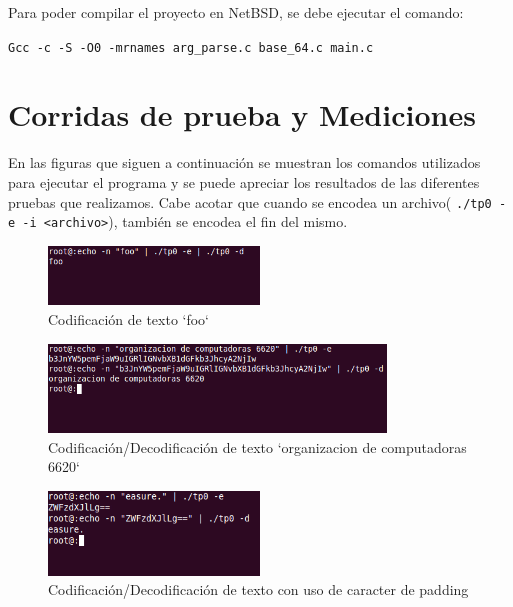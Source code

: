 \documentclass[a4paper,10pt,oneside]{article}
\begin{document}
	Para poder compilar el proyecto en NetBSD, se debe ejecutar el comando:
	
	\begin{center}
	\texttt{Gcc -c -S -O0 -mrnames arg_parse.c base_64.c main.c} 
	\end{center}
	
	
\section{Corridas de prueba y Mediciones}

	En las figuras que siguen a continuación se muestran los comandos utilizados para ejecutar el programa y se puede apreciar los resultados de las diferentes pruebas que realizamos. Cabe acotar que cuando se encodea un archivo( \texttt{./tp0 -e -i <archivo>}), también se encodea el fin del mismo. \newpage
	
	\begin{figure}[H]
		\begin{center}
			\includegraphics[width=0.50\textwidth]{test1.png}
		\end{center}
		\caption{Codificación de texto `foo`} \label{Figura 1}
	\end{figure}

	\begin{figure}[H]
		\begin{center}
			\includegraphics[width=0.80\textwidth]{test2.png}
		\end{center}
		\caption{Codificación/Decodificación de texto `organizacion de computadoras 6620`} \label{Figura 2}
	\end{figure}

	\begin{figure}[H]
		\begin{center}
			\includegraphics[width=0.50\textwidth]{test3.png}
		\end{center}
		\caption{Codificación/Decodificación de texto con uso de caracter de padding} \label{Figura 3}
	\end{figure}
	
\end{document}
